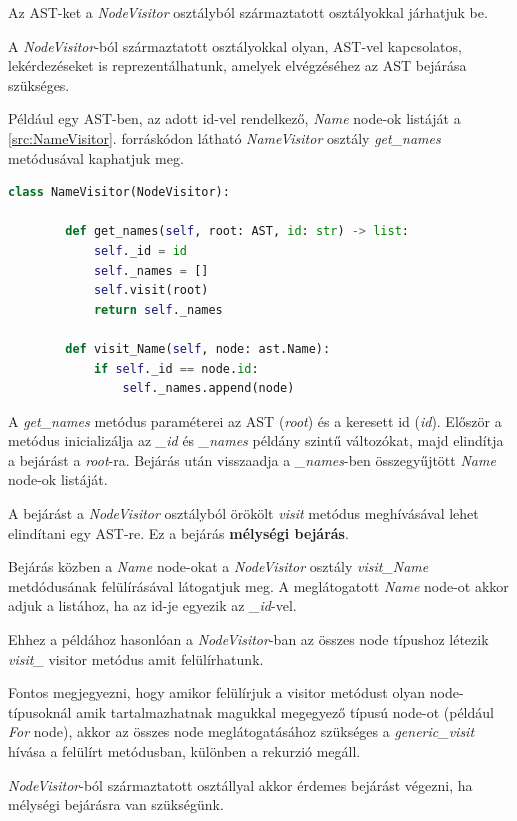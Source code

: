 Az AST-ket a \emph{NodeVisitor} osztályból származtatott osztályokkal járhatjuk be.

A \emph{NodeVisitor}-ból származtatott osztályokkal olyan, AST-vel kapcsolatos,
lekérdezéseket is reprezentálhatunk, amelyek elvégzéséhez az AST bejárása szükséges.

Például egy AST-ben, az adott id-vel rendelkező, \emph{Name} node-ok listáját
a \ref{src:NameVisitor}. forráskódon látható \emph{NameVisitor} osztály
\emph{get\_names} metódusával kaphatjuk meg.

\begin{lstlisting}[language={Python}]
	class NameVisitor(NodeVisitor):
		
		def get_names(self, root: AST, id: str) -> list:
			self._id = id
			self._names = []
			self.visit(root)
			return self._names
		
		def visit_Name(self, node: ast.Name):
			if self._id == node.id:
				self._names.append(node)
\end{lstlisting}

A \emph{get\_names} metódus paraméterei az AST (\emph{root}) és a keresett id (\emph{id}).
Először a metódus inicializálja az \emph{\_id} és \emph{\_names} példány szintű változókat,
majd elindítja a bejárást a \emph{root}-ra.
Bejárás után visszaadja a \emph{\_names}-ben összegyűjtött \emph{Name} node-ok listáját.

A bejárást a \emph{NodeVisitor} osztályból örökölt \emph{visit} metódus meghívásával
lehet elindítani egy AST-re. Ez a bejárás \textbf{mélységi bejárás}.

Bejárás közben a \emph{Name} node-okat a \emph{NodeVisitor} osztály \emph{visit\_Name}
metdódusának felülírásával látogatjuk meg.
A meglátogatott \emph{Name} node-ot akkor adjuk a listához,
ha az id-je egyezik az \emph{\_id}-vel.

Ehhez a példához hasonlóan a \emph{NodeVisitor}-ban az összes node típushoz
létezik \emph{visit\_<node-class>} visitor metódus amit felülírhatunk.

Fontos megjegyezni, hogy amikor felülírjuk a visitor metódust olyan node-típusoknál
amik tartalmazhatnak magukkal megegyező típusú node-ot (például \emph{For} node),
akkor az összes node meglátogatásához szükséges a \emph{generic\_visit} hívása
a felülírt metódusban, különben a rekurzió megáll.

\emph{NodeVisitor}-ból származtatott osztállyal akkor érdemes bejárást végezni,
ha mélységi bejárásra van szükségünk.

